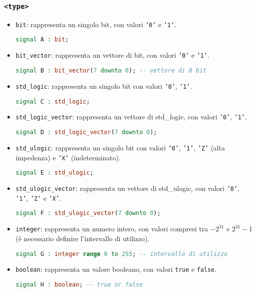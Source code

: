         \subsubsection{\texttt{<type>}}
        \begin{itemize}
        \setlength\itemsep{0pt}
            \item \texttt{bit}: rappresenta un singolo bit, con valori \texttt{'0'} e \texttt{'1'}.
            \begin{lstlisting}[language=VHDL]
signal A : bit;
            \end{lstlisting}
            \item \texttt{bit\_vector}: rappresenta un vettore di bit, con valori \texttt{'0'} e \texttt{'1'}.
            \begin{lstlisting}[language=VHDL]
signal B : bit_vector(7 downto 0); -- vettore di 8 bit
            \end{lstlisting}
            \item \texttt{std\_logic}: rappresenta un singolo bit con valori \texttt{'0'}, \texttt{'1'}.
            \begin{lstlisting}[language=VHDL]
signal C : std_logic;
            \end{lstlisting}
            \item \texttt{std\_logic\_vector}: rappresenta un vettore di std\_logic, con valori \texttt{'0'}, \texttt{'1'}.
            \begin{lstlisting}[language=VHDL]
signal D : std_logic_vector(7 downto 0);
            \end{lstlisting}
            \item \texttt{std\_ulogic}: rappresenta un singolo bit con valori \texttt{'0'}, \texttt{'1'}, \texttt{'Z'} (alta impedenza) e \texttt{'X'} (indeterminato).
            \begin{lstlisting}[language=VHDL]
signal E : std_ulogic;
            \end{lstlisting}
            \item \texttt{std\_ulogic\_vector}: rappresenta un vettore di std\_ulogic, con valori \texttt{'0'}, \texttt{'1'}, \texttt{'Z'} e \texttt{'X'}.
            \begin{lstlisting}[language=VHDL]
signal F : std_ulogic_vector(7 downto 0);
            \end{lstlisting}
            \item \texttt{integer}: rappresenta un numero intero, con valori compresi tra $-2^{31}$ e $2^{31}-1$ (è necessario definire l'intervallo di utilizzo).
            \begin{lstlisting}[language=VHDL]
signal G : integer range 0 to 255; -- intervallo di utilizzo
            \end{lstlisting}
            \item \texttt{boolean}: rappresenta un valore booleano, con valori \texttt{true} e \texttt{false}.
            \begin{lstlisting}[language=VHDL]
signal H : boolean; -- true or false
            \end{lstlisting}
        \end{itemize}
        
